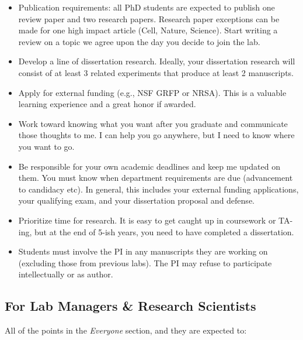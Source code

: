 \documentclass[
]{book}
\providecommand{\tightlist}{%
  \setlength{\itemsep}{0pt}\setlength{\parskip}{0pt}}
\begin{document}
\begin{itemize}
\tightlist
\item
  Publication requirements: all PhD students are expected to publish one review paper and two research papers. Research paper exceptions can be made for one high impact article (Cell, Nature, Science). Start writing a review on a topic we agree upon the day you decide to join the lab.
\item
  Develop a line of dissertation research. Ideally, your dissertation research will consist of at least 3 related experiments that produce at least 2 manuscripts.
\item
  Apply for external funding (e.g., NSF GRFP or NRSA). This is a valuable learning experience and a great honor if awarded.
\item
  Work toward knowing what you want after you graduate and communicate those thoughts to me. I can help you go anywhere, but I need to know where you want to go.
\item
  Be responsible for your own academic deadlines and keep me updated on them. You must know when department requirements are due (advancement to candidacy etc). In general, this includes your external funding applications, your qualifying exam, and your dissertation proposal and defense.
\item
  Prioritize time for research. It is easy to get caught up in coursework or TA-ing, but at the end of 5-ish years, you need to have completed a dissertation.
\item
  Students must involve the PI in any manuscripts they are working on (excluding those from previous labs). The PI may refuse to participate intellectually or as author.
\end{itemize}

\hypertarget{for-lab-managers-research-scientists}{%
\subsection{For Lab Managers \& Research Scientists}\label{for-lab-managers-research-scientists}}

All of the points in the \emph{Everyone} section, and they are expected to:
\end{document}

